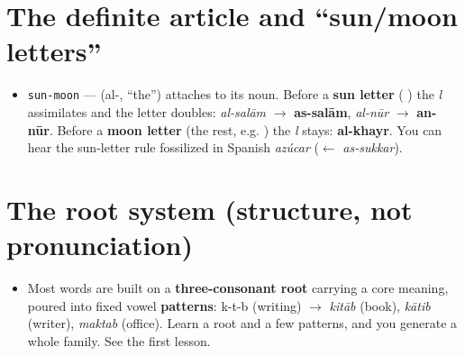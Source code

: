 \section*{The definite article and \textquotedblleft{}sun/moon letters\textquotedblright{}}

\begin{itemize}
\raggedright
\setlength{\itemsep}{0.35em}
  \item \texttt{sun-moon} — \textbf{} (al-, \textquotedblleft{}the\textquotedblright{}) attaches to its noun. Before a \textbf{sun letter} (             ) the \emph{l} assimilates and the letter doubles: \emph{al-salām} $\to$ \textbf{as-salām}, \emph{al-nūr} $\to$ \textbf{an-nūr}. Before a \textbf{moon letter} (the rest, e.g.    ) the \emph{l} stays: \textbf{al-khayr}. You can hear the sun-letter rule fossilized in Spanish \emph{azúcar} ($\leftarrow$ \emph{as-sukkar}).
\end{itemize}

\section*{The root system (structure, not pronunciation)}

\begin{itemize}
\raggedright
\setlength{\itemsep}{0.35em}
  \item Most words are built on a \textbf{three-consonant root} carrying a core meaning, poured into fixed vowel \textbf{patterns}: k-t-b (writing) $\to$ \emph{kitāb} (book), \emph{kātib} (writer), \emph{maktab} (office). Learn a root and a few patterns, and you generate a whole family. See the first lesson.
\end{itemize}
